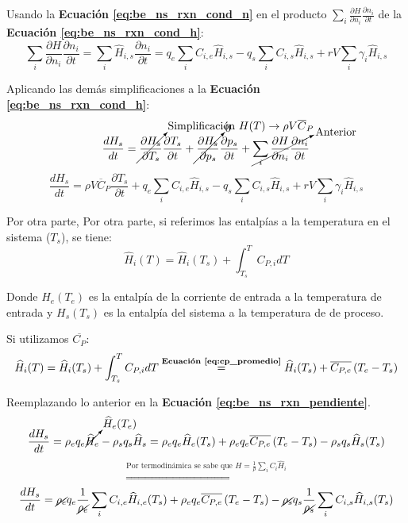         Usando la \textbf{Ecuación \ref{eq:be_ns_rxn_cond_n}} en el producto \(\sum_{i}\frac{\partial H}{\partial n_{i}}\frac{\partial n_{i}}{\partial t}\) de la \textbf{Ecuación \ref{eq:be_ns_rxn_cond_h}}:
        \[\sum_{i}\frac{\partial H}{\partial n_{i}}\frac{\partial n_{i}}{\partial t} = \sum_{i} \widehat{H}_{i,s} \frac{\partial n_{i}}{\partial t} = q_{e} \sum_{i} C_{i,e} \widehat{H}_{i,s} - q_{s} \sum_{i} C_{i,s} \widehat{H}_{i,s} + rV \sum_{i} \gamma_{i} \widehat{H}_{i,s}\]
        
        Aplicando las demás simplificaciones a la \textbf{Ecuación \ref{eq:be_ns_rxn_cond_h}}:
        \[\frac{dH_{s}}{dt} = \cancelto{\text{Simplificación }H(T) \rightarrow \rho V \overline{C}_{P}}{\frac{\partial H_{s}}{\partial T_{s}}}\frac{\partial T_{s}}{\partial t} + \cancelto{0}{\frac{\partial H_{s}}{\partial p_{s}}}\frac{\partial p_{s}}{\partial t} + \cancelto{\text{Anterior}}{\sum_{i}\frac{\partial H}{\partial n_{i}}\frac{\partial n_{i}}{\partial t}}\]
        \begin{equation}
        \label{eq:hs_pendiente_1}
            \frac{dH_{s}}{dt} =\rho V \overline{C}_{P}\frac{\partial T_{s}}{\partial t} + q_{e} \sum_{i} C_{i,e} \widehat{H}_{i,s} - q_{s} \sum_{i} C_{i,s} \widehat{H}_{i,s} + rV \sum_{i} \gamma_{i} \widehat{H}_{i,s}
        \end{equation}
        
        Por otra parte, Por otra parte, si referimos las entalpías a la temperatura en el sistema (\(T_{s}\)), se tiene:
        \[\widehat{H}_{i}(T) = \widehat{H}_{i}(T_{s}) + \int_{T_{s}}^{T} C_{P,i} dT\]
        
        Donde \(H_{e}(T_{e})\) es la entalpía de la corriente de entrada a la temperatura de entrada y \(H_{s}(T_{s})\) es la entalpía del sistema a la temperatura de de proceso.
        
        Si utilizamos \(\overline{{C}_{P}}\):
        \[\widehat{H}_{i}(T) = \widehat{H}_{i}(T_{s}) + \int_{T_{s}}^{T} C_{P,i} dT \overset{\textbf{Ecuación \ref{eq:cp_promedio}}}{=} \widehat{H}_{i}(T_{s}) + \overline{C_{P,e}} \left ( T_{e} - T_{s} \right )\]
        
        Reemplazando lo anterior en la \textbf{Ecuación \ref{eq:be_ns_rxn_pendiente}}.
        \[\frac{d{H}_{s}}{dt} = \rho_{e} q_{e} \cancelto{\widehat{H}_{e}(T_{e})}{\widehat{H}_{e}} - \rho_{s} q_{s} \widehat{H}_{s} = \rho_{e} q_{e} \widehat{H}_{e}(T_{s}) + \rho_{e} q_{e} \overline{C_{P,e}} \left ( T_{e} - T_{s} \right ) - \rho_{s} q_{s} \widehat{H}_{s}(T_{s})\]
        \[\overset{\text{Por termodinámica se sabe que } H = \frac{1}{\rho} \sum_{i} C_{i} \widehat{H}_{i}}{\Rightarrow}\]
        \begin{equation}
        \label{eq:hs_pendiente_2}
            \frac{d{H}_{s}}{dt} = \cancel{\rho_{e}} q_{e} \frac{1}{\cancel{\rho_{e}}} \sum_{i} C_{i,e} \widehat{H}_{i, e}(T_{s}) + \rho_{e} q_{e} \overline{C_{P,e}} \left ( T_{e} - T_{s} \right ) - \cancel{\rho_{s}} q_{s} \frac{1}{\cancel{\rho_{s}}} \sum_{i} C_{i,s} \widehat{H}_{i,s}(T_{s})
        \end{equation}
        
